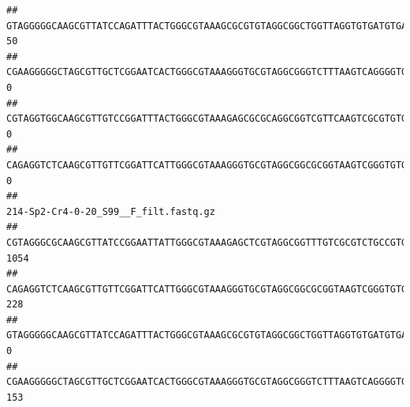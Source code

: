 \documentclass[]{article}
\begin{document}
\begin{verbatim}
## GTAGGGGGCAAGCGTTATCCAGATTTACTGGGCGTAAAGCGCGTGTAGGCGGCTGGTTAGGTGTGATGTGAAATCTTCCGGCTCAACCGGAAAACTGCATTGCAAACCGGCCTGGCTAGAGTGCAGGAGAGGGAAGCGGAATTCCAGGTGTAGCGGTGAAATGCGTAGATATCTGGAGGAACACCAGTGGCGAAGGCGGCTTCCTGGCCTGCAACTGACGCTGAGACGCGAAAGCGTGGGGAGCGAAC                                     50
## CGAAGGGGGCTAGCGTTGCTCGGAATCACTGGGCGTAAAGGGTGCGTAGGCGGGTCTTTAAGTCAGGGGTGAAATCCTGGAGCTCAACTCCAGAACTGCCTTTGATACTGAAGATCTTGAGTTCGGGAGAGGTGAGTGGAACTGCGAGTGTAGAGGTGAAATTCGTAGATATTCGCAAGAACACCAGTGGCGAAGGCGGCTCACTGGCCCGATACTGACGCTGAGGCACGAAAGCGTGGGGAGCAAACA                                     0
## CGTAGGTGGCAAGCGTTGTCCGGATTTACTGGGCGTAAAGAGCGCGCAGGCGGTCGTTCAAGTCGCGTGTGAAAGCCCCCGGCTCAACTGGGGAGGGTCACGCGATACTGATCGACTCGAAGGCAGGAGAGGGTAGTGGAATTCCCGGTGTAGTGGTGAAATGCGTAGATATCGGGAGGAACACCAGTGGCGAAGGCGACTACCTGGCCTGTTCTTGACGCTGAGGCGCGAAAGCTAGGGGAGCAAACG                                     0
## CAGAGGTCTCAAGCGTTGTTCGGATTCATTGGGCGTAAAGGGTGCGTAGGCGGCGCGGTAAGTCGGGTGTGAAATCTCGGGGCTTAACTCCGAAACTGCATTCGATACTGCCGTGCTTGAGGACTGGAGAGGAGACTGGAATTTACGGTGTAGCGGTGAAATGCGTAGATATCGTAAGGAAGACCAGTGGCGAAGGCGGGTCTCTGGACAGTTCCTGACGCTGAGGCACGAAGGCCAGGGGAGCAAACG                                     0
##                                                                                                                                                                                                                                                           214-Sp2-Cr4-0-20_S99__F_filt.fastq.gz
## CGTAGGGCGCAAGCGTTATCCGGAATTATTGGGCGTAAAGAGCTCGTAGGCGGTTTGTCGCGTCTGCCGTGAAAGTCCGGGGCTCAACTCCGGATCTGCGGTGGGTACGGGCAGACTAGAGTGATGTAGGGGAGACTGGAATTCCTGGTGTAGCGGTGAAATGCGCAGATATCAGGAGGAACACCGATGGCGAAGGCAGGTCTCTGGGCATTAACTGACGCTGAGGAGCGAAAGCATGGGGAGCGAACA                                  1054
## CAGAGGTCTCAAGCGTTGTTCGGATTCATTGGGCGTAAAGGGTGCGTAGGCGGCGCGGTAAGTCGGGTGTGAAATCTCGGAGCTTAACTCCGAAACTGCATTCGATACTGCCGTGCTTGAGGACTGGAGAGGAGACTGGAATTTACGGTGTAGCGGTGAAATGCGTAGATATCGTAAGGAAGACCAGTGGCGAAGGCGGGTCTCTGGACAGTTCCTGACGCTGAGGCACGAAGGCCAGGGGAGCAAACG                                   228
## GTAGGGGGCAAGCGTTATCCAGATTTACTGGGCGTAAAGCGCGTGTAGGCGGCTGGTTAGGTGTGATGTGAAATCTTCCGGCTCAACCGGAAAACTGCATTGCAAACCGGCCTGGCTAGAGTGCAGGAGAGGGAAGCGGAATTCCAGGTGTAGCGGTGAAATGCGTAGATATCTGGAGGAACACCAGTGGCGAAGGCGGCTTCCTGGCCTGCAACTGACGCTGAGACGCGAAAGCGTGGGGAGCGAAC                                      0
## CGAAGGGGGCTAGCGTTGCTCGGAATCACTGGGCGTAAAGGGTGCGTAGGCGGGTCTTTAAGTCAGGGGTGAAATCCTGGAGCTCAACTCCAGAACTGCCTTTGATACTGAAGATCTTGAGTTCGGGAGAGGTGAGTGGAACTGCGAGTGTAGAGGTGAAATTCGTAGATATTCGCAAGAACACCAGTGGCGAAGGCGGCTCACTGGCCCGATACTGACGCTGAGGCACGAAAGCGTGGGGAGCAAACA                                   153

\end{verbatim}
\end{document}
